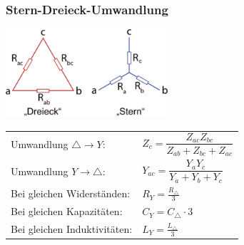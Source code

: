 	
		\subsubsection{Stern-Dreieck-Umwandlung}%
		  \begin{minipage}[lt]{7.5 cm}
		    \includegraphics[width=6cm]{images/stern-dreieck.png}
		  \end{minipage}
		  \begin{minipage}[rt]{9.35 cm} %
	      \renewcommand{\arraystretch}{2}
		  \begin{tabular}{ll}
			Umwandlung $\triangle \rightarrow Y$:
				&$Z_{c} = \dfrac{Z_{ac} Z_{bc}}{Z_{ab}+Z_{bc}+Z_{ac}}$\\
			Umwandlung $Y \rightarrow \triangle$:
				&$Y_{ac}=\dfrac{Y_{a} Y_{c}}{Y_{a}+Y_{b}+Y_{c}}$\\
			Bei gleichen Widerständen:
			&$R_Y = \frac{R_\triangle}{3}$ \\
			Bei gleichen Kapazitäten:
			&$C_Y = C_\triangle \cdot 3 $ \\
			Bei gleichen Induktivitäten:
			&$L_Y = \frac{L_\triangle}{3}$
			  \end{tabular}
		      \renewcommand{\arraystretch}{1}
			  \end{minipage}
	
